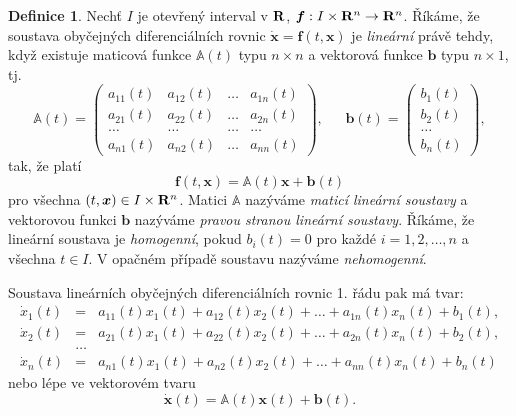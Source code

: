 \documentclass[a4paper, 12pt]{book}
\theoremstyle{definition}
\newtheorem{definition}[theorem]{Definice}
\def\to{\rightarrow}
\def\Real{{\rm\bf R}}
\def\vc#1{\mathbf{\boldsymbol{#1}}}     %
\def\tn#1{{\mathbb{#1}}}    %
\def\df#1{\emph{#1}}
\begin{document}
\begin{definition}
Nechť $I$ je otevřený interval v $\Real$, $\vc f: I\times \Real^n \to \Real^n$.
Říkáme, že soustava obyčejných diferenciálních rovnic 
$\dot{\vc x}=\vc f(t,\vc x)$ je \df{lineární} právě tehdy, když existuje maticová 
funkce $\tn A(t)$ typu $n\times n$ a vektorová funkce $\vc b$ typu $n\times 1$, tj.
\begin{equation}
{\tn A}(t) = \left(\begin{array}{rrrr}
a_{11}(t)&a_{12}(t)&\dots&a_{1n}(t)\\
a_{21}(t)&a_{22}(t)&\dots&a_{2n}(t)\\
\dots&\dots&\dots&\dots\\
a_{n1}(t)&a_{n2}(t)&\dots&a_{nn}(t)
\end{array}\right), ~~~~~~~
{\vc b}(t) = \left(\begin{array}{c}
b_1(t)\\ b_2(t)\\ \dots\\ b_n(t)
\end{array}\right),
\end{equation}
tak, že platí 
\begin{equation}
\vc f(t, \vc x)={\tn A}(t)\vc x+{\vc b}(t)
\end{equation}
pro všechna $(t,\vc x)\in I\times \Real^n$.
Matici $\tn A$ nazýváme \emph{maticí lineární soustavy} a vektorovou funkci 
$\vc b$ nazýváme \emph{pravou stranou lineární soustavy}. Říkáme, že lineární 
soustava je \emph{homogenní}, pokud $b_i(t)=0$ pro každé $i=1,2,\dots,n$ a 
všechna $t\in I$. V opačném případě soustavu nazýváme \emph{nehomogenní}.
\end{definition}

Soustava lineárních obyčejných diferenciálních rovnic 1. řádu pak má tvar:
\begin{equation}
\begin{array}{rcl}
\dot x_1(t)&=&a_{11}(t)x_1(t)+a_{12}(t)x_2(t)+\dots+a_{1n}(t)x_n(t)+b_1(t),\\
\dot x_2(t)&=&a_{21}(t)x_1(t)+a_{22}(t)x_2(t)+\dots+a_{2n}(t)x_n(t)+b_2(t),\\
&\dots&\\
\dot x_n(t)&=&a_{n1}(t)x_1(t)+a_{n2}(t)x_2(t)+\dots+a_{nn}(t)x_n(t)+b_n(t)
\end{array}
\end{equation}
nebo lépe ve vektorovém tvaru
\begin{equation}
\label{eq:linODR}
\dot {\vc x}(t)={\tn A}(t)\vc x(t)+{\vc b}(t).
\end{equation}
\end{document}
